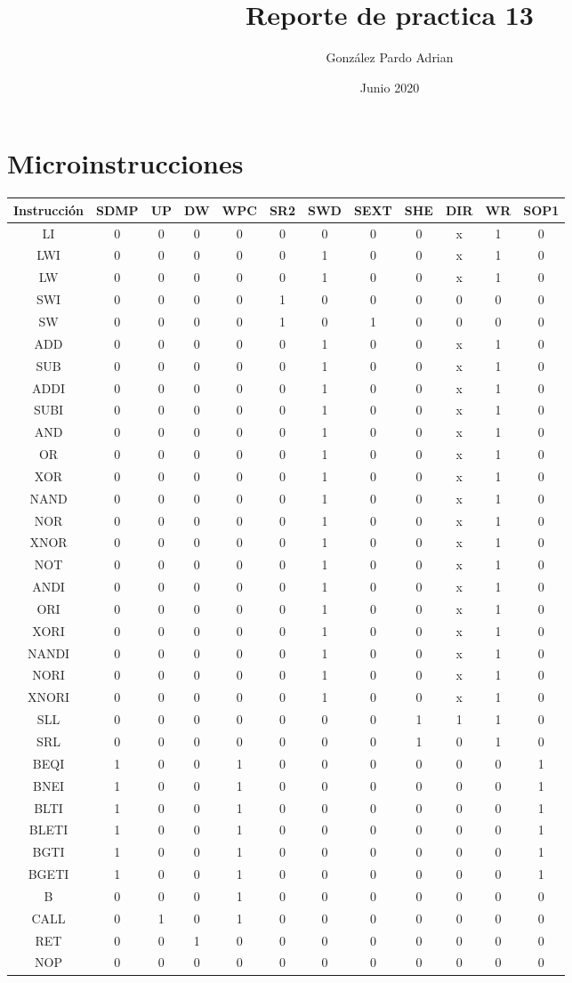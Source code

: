 \documentclass[8pt,executivepaper]{article}
\author{González Pardo Adrian}
\date{Junio 2020}
\title{Reporte de practica 13}
\begin{document}
\maketitle
\section{Microinstrucciones}
\begin{tabular}{|c|c|c|c|c|c|c|c|c|c|c|c|}
  \hline
  Instrucción&SDMP&UP&DW&WPC&SR{\tiny2}&SWD&SEXT&SHE&DIR&WR&SOP{\tiny1}\\\hline
  LI&0&0&0&0&0&0&0&0&x&1&0\\\hline
  LWI&0&0&0&0&0&1&0&0&x&1&0\\\hline
  LW&0&0&0&0&0&1&0&0&x&1&0\\\hline
  SWI&0&0&0&0&1&0&0&0&0&0&0\\\hline
  SW&0&0&0&0&1&0&1&0&0&0&0\\\hline
  ADD&0&0&0&0&0&1&0&0&x&1&0\\\hline
  SUB&0&0&0&0&0&1&0&0&x&1&0\\\hline
  ADDI&0&0&0&0&0&1&0&0&x&1&0\\\hline
  SUBI&0&0&0&0&0&1&0&0&x&1&0\\\hline
  AND&0&0&0&0&0&1&0&0&x&1&0\\\hline
  OR&0&0&0&0&0&1&0&0&x&1&0\\\hline
  XOR&0&0&0&0&0&1&0&0&x&1&0\\\hline
  NAND&0&0&0&0&0&1&0&0&x&1&0\\\hline
  NOR&0&0&0&0&0&1&0&0&x&1&0\\\hline
  XNOR&0&0&0&0&0&1&0&0&x&1&0\\\hline
  NOT&0&0&0&0&0&1&0&0&x&1&0\\\hline
  ANDI&0&0&0&0&0&1&0&0&x&1&0\\\hline
  ORI&0&0&0&0&0&1&0&0&x&1&0\\\hline
  XORI&0&0&0&0&0&1&0&0&x&1&0\\\hline
  NANDI&0&0&0&0&0&1&0&0&x&1&0\\\hline
  NORI&0&0&0&0&0&1&0&0&x&1&0\\\hline
  XNORI&0&0&0&0&0&1&0&0&x&1&0\\\hline
  SLL&0&0&0&0&0&0&0&1&1&1&0\\\hline
  SRL&0&0&0&0&0&0&0&1&0&1&0\\\hline
  BEQI&1&0&0&1&0&0&0&0&0&0&1\\\hline
  BNEI&1&0&0&1&0&0&0&0&0&0&1\\\hline
  BLTI&1&0&0&1&0&0&0&0&0&0&1\\\hline
  BLETI&1&0&0&1&0&0&0&0&0&0&1\\\hline
  BGTI&1&0&0&1&0&0&0&0&0&0&1\\\hline
  BGETI&1&0&0&1&0&0&0&0&0&0&1\\\hline
  B&0&0&0&1&0&0&0&0&0&0&0\\\hline
  CALL&0&1&0&1&0&0&0&0&0&0&0\\\hline
  RET&0&0&1&0&0&0&0&0&0&0&0\\\hline
  NOP&0&0&0&0&0&0&0&0&0&0&0\\\hline
\end{tabular}
\end{document}
